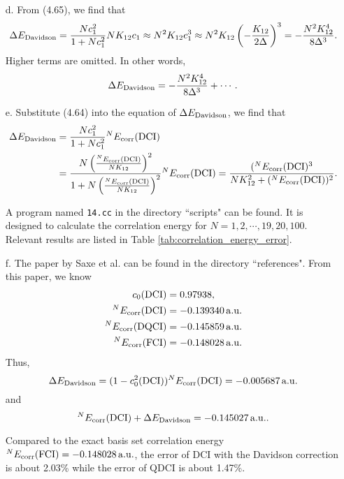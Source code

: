 \documentclass[a4paper]{book}
\newcommand{\corr}{{\rm corr}}
\newcommand{\au}{{\rm a.u.}}
\newcommand\Tableref[1]{Table \ref{#1}}
\begin{document}
\begin{solution}
\begin{itemize}
	\item[d.] From (4.65), we find that
	\[
		\Delta E_{\rm Davidson} = \frac{ N c^2_1 }{ 1 + Nc^2_1 } N K_{12} c_1 \approx N^2 K_{12} c^3_1 \approx N^2 K_{12} \left( - \frac{ K_{12} }{ 2 \Delta } \right)^3 = - \frac{ N^2 K^4_{12} }{ 8\Delta^3 }.
	\]
	Higher terms are omitted. In other words,
	\begin{equation}
		\Delta E_{\rm Davidson} = - \frac{ N^2 K^4_{12} }{ 8\Delta^3 } + \cdots.
	\end{equation}
	
	\item[e.] Substitute (4.64) into the equation of $\Delta E_{\rm Davidson}$, we find that
	\begin{align}
		\Delta E_{\rm Davidson} &= \frac{ N c^2_1 }{ 1 + Nc^2_1 }    {}^N E_\corr( {\rm DCI} ) \notag \\
		&= \frac{ N \left( \frac{ {}^N E_\corr( {\rm DCI} ) }{ N K_{12} } \right)^2 }{ 1 + N \left( \frac{ {}^N E_\corr( {\rm DCI} ) }{ N K_{12} } \right)^2 } {}^N E_\corr( {\rm DCI} ) = \frac{ ( {}^N E_\corr( {\rm DCI} )^3 }{ N K^2_{12} + ( {}^N E_\corr( {\rm DCI} ) )^2 }.
	\end{align}
	
	A program named \verb!14.cc! in the directory ``scripts" can  be found. It is designed to calculate the correlation energy for $N=1,2,\cdots,19,20,100$. Relevant results are listed in \Tableref{tab:correlation_energy_error}.
	
	\item[f.] The paper by Saxe et al. can be found in the directory ``references". From this paper, we know
	\begin{align*}
		c_0({\rm DCI}) &= 0.97938, \\
		{}^N E_\corr( {\rm DCI} ) &= -0.139340 \, \au \\
		{}^N E_\corr( {\rm DQCI} ) &= -0.145859 \, \au \\
		{}^N E_\corr( {\rm FCI} ) &= -0.148028 \, \au
	\end{align*}
	Thus,
	\[
		\Delta E_{\rm Davidson} = ( 1 - c^2_0({\rm DCI}) ) {}^N E_\corr( {\rm DCI} ) = -0.005687 \, \au
	\]
	and
	\[
		{}^N E_\corr( {\rm DCI} ) + \Delta E_{\rm Davidson} = -0.145027 \, \au.
	\]
	
	Compared to the exact basis set correlation energy ${}^N E_\corr( {\rm FCI} ) = -0.148028 \, \au$, the error of DCI with the Davidson correction is about 2.03\% while the error of QDCI is about 1.47\%.
	

\end{itemize}
\end{solution}
\end{document}
